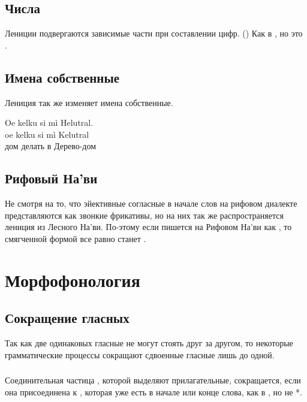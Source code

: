 \subsection{Числа}
Лениции подвергаются зависимые части при составлении цифр.
() Как в  ,
но  это .

\subsection{Имена собственные} Лениция так же изменяет имена собственные.

\begin{interlin} \label{lenition:ex01}
\glll Oe kelku si mì Helutral. \\
      oe kelku si mì Kelutral \\
      дом делать в Дерево-дом \\
\end{interlin}


\subsection{Рифовый На'ви} 
Не смотря на то, что эйективные согласные в начале слов на рифовом диалекте представляются как звонкие фрикативы, но на них так же распространяется лениция из Лесного На'ви. По-этому если   пишется на Рифовом На'ви как , то смягченной формой все равно станет .

\section{Морфофонология}

\subsection{Сокращение гласных} Так как две одинаковых гласные не могут стоять друг за другом, то некоторые грамматические процессы сокращают сдвоенные гласные лишь до одной.\label{l-and-s:contract}

\subsubsection{} Соединительная частица , которой выделяют прилагательные, сокращается, если она присоединена к , которая уже есть в начале или конце слова, как в
, но не *.

